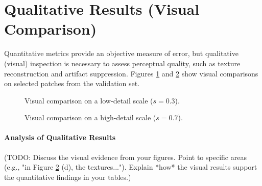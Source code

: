 \section{Qualitative Results (Visual Comparison)}
\label{sec:results_qualitative}

Quantitative metrics provide an objective measure of error, but qualitative (visual) inspection is necessary to assess perceptual quality, such as texture reconstruction and artifact suppression. Figures \ref{fig:qual_low_scale} and \ref{fig:qual_high_scale} show visual comparisons on selected patches from the validation set.


\begin{figure}[h!]
    \centering
    
    
    \caption{Visual comparison on a low-detail scale ($s=0.3$).}
    \label{fig:qual_low_scale}
\end{figure}

\begin{figure}[h!]
    \centering
    
    
    \caption{Visual comparison on a high-detail scale ($s=0.7$).}
    \label{fig:qual_high_scale}
\end{figure}

\paragraph{Analysis of Qualitative Results}
(TODO: Discuss the visual evidence from your figures. Point to specific areas (e.g., "in Figure \ref{fig:qual_high_scale} (d), the textures..."). Explain *how* the visual results support the quantitative findings in your tables.)